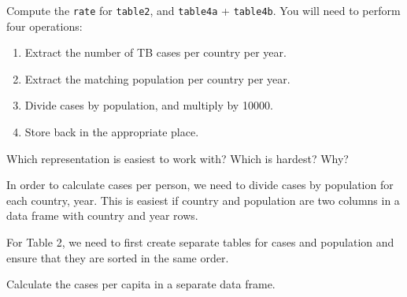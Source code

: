 \documentclass[]{book}
\newenvironment{Shaded}{\begin{snugshade}}{\end{snugshade}}
\newcommand{\DataTypeTok}[1]{\textcolor[rgb]{0.13,0.29,0.53}{#1}}
\newcommand{\DecValTok}[1]{\textcolor[rgb]{0.00,0.00,0.81}{#1}}
\newcommand{\KeywordTok}[1]{\textcolor[rgb]{0.13,0.29,0.53}{\textbf{#1}}}
\newcommand{\NormalTok}[1]{#1}
\newcommand{\OperatorTok}[1]{\textcolor[rgb]{0.81,0.36,0.00}{\textbf{#1}}}
\newcommand{\StringTok}[1]{\textcolor[rgb]{0.31,0.60,0.02}{#1}}
\providecommand{\tightlist}{%
  \setlength{\itemsep}{0pt}\setlength{\parskip}{0pt}}
\theoremstyle{plain}
\theoremstyle{remark}
\begin{document}
Compute the \texttt{rate} for \texttt{table2}, and \texttt{table4a} +
\texttt{table4b}. You will need to perform four operations:

\begin{enumerate}
\def\labelenumi{\arabic{enumi}.}
\tightlist
\item
  Extract the number of TB cases per country per year.
\item
  Extract the matching population per country per year.
\item
  Divide cases by population, and multiply by 10000.
\item
  Store back in the appropriate place.
\end{enumerate}

Which representation is easiest to work with? Which is hardest? Why?

In order to calculate cases per person, we need to divide cases by
population for each country, year. This is easiest if country and
population are two columns in a data frame with country and year rows.

For Table 2, we need to first create separate tables for cases and
population and ensure that they are sorted in the same order.

\begin{Shaded}
\end{Shaded}

Calculate the cases per capita in a separate data frame.

\begin{Shaded}
\end{Shaded}
\end{document}
